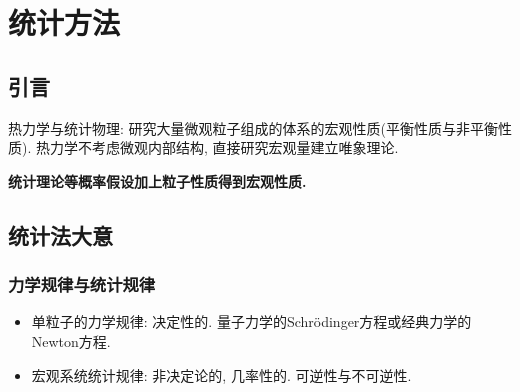 \chapter{统计方法}
\section{引言}
热力学与统计物理: 研究大量微观粒子组成的体系的宏观性质(平衡性质与非平衡性质).
热力学不考虑微观内部结构, 直接研究宏观量建立唯象理论.

\textbf{统计理论等概率假设加上粒子性质得到宏观性质.}

\section{统计法大意}
\subsection{力学规律与统计规律}

\begin{itemize}
    \item 单粒子的力学规律: 决定性的. 量子力学的Schr\"odinger方程或经典力学的Newton方程.
    \item 宏观系统统计规律: 非决定论的, 几率性的. 可逆性与不可逆性.
\end{itemize}

